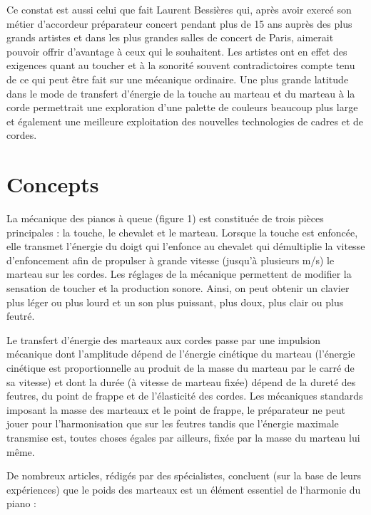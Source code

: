 \documentclass[french,a4paper,12pt]{report}
\begin{document}
Ce constat est aussi celui que fait Laurent Bessières qui, après avoir exercé son métier d’accordeur préparateur concert pendant plus de 15 ans auprès des plus grands artistes et dans les plus grandes salles de concert de Paris, aimerait pouvoir offrir d’avantage à ceux qui le souhaitent. Les artistes ont en effet des exigences quant au toucher et à la sonorité souvent contradictoires compte tenu de ce qui peut être fait sur une mécanique ordinaire. Une plus grande latitude dans le mode de transfert d’énergie de la touche au marteau et du marteau à la corde permettrait une exploration d’une palette de couleurs beaucoup plus large et également une meilleure exploitation des nouvelles technologies de cadres et de cordes.

\section{Concepts} 

La mécanique des pianos à queue (figure 1) est constituée de trois pièces principales : la touche, le chevalet et le marteau. Lorsque la touche est enfoncée, elle transmet l’énergie du doigt qui l’enfonce au chevalet qui démultiplie la vitesse d’enfoncement afin de propulser à grande vitesse (jusqu’à plusieurs m/s) le marteau sur les cordes. Les réglages de la mécanique permettent de modifier la sensation de toucher et la production sonore. Ainsi, on peut obtenir un clavier plus léger ou plus lourd et un son plus puissant, plus doux, plus clair ou plus feutré.

Le transfert d’énergie des marteaux aux cordes passe par une impulsion mécanique dont l’amplitude dépend de l’énergie cinétique du marteau (l’énergie cinétique est proportionnelle au produit de la masse du marteau par le carré de sa vitesse) et dont la durée (à vitesse de marteau fixée) dépend de la dureté des feutres, du point de frappe et de l’élasticité des cordes. Les mécaniques standards imposant la masse des marteaux et le point de frappe, le préparateur ne peut jouer pour l’harmonisation que sur les feutres tandis que l’énergie maximale transmise est, toutes choses égales par ailleurs, fixée par la masse du marteau lui même.

De nombreux articles, rédigés par des spécialistes, concluent (sur la base de leurs expériences) que le poids des marteaux est un élément essentiel de l‘harmonie du piano :
\end{document}
